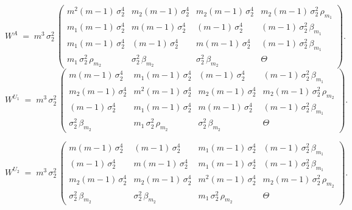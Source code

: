 \documentclass[12pt,a4paper]{article}
\begin{document}
\[
W^{A} \;=\; m^{3}\,\sigma_{2}^{2}\,
\begin{pmatrix}
m^{2}(m-1)\,\sigma_{2}^{4} & m_{2}(m-1)\,\sigma_{2}^{4} & m_{2}(m-1)\,\sigma_{2}^{4} & m_{2}(m-1)\,\sigma_{2}^{2}\,\rho_{m_{1}} \\[2pt]
m_{1}(m-1)\,\sigma_{2}^{4} & m(m-1)\,\sigma_{2}^{4}    & (m-1)\,\sigma_{2}^{4}      & (m-1)\,\sigma_{2}^{2}\,\beta_{m_{1}}     \\[2pt]
m_{1}(m-1)\,\sigma_{2}^{4} & (m-1)\,\sigma_{2}^{4}     & m(m-1)\,\sigma_{2}^{4}    & (m-1)\,\sigma_{2}^{2}\,\beta_{m_{1}}     \\[2pt]
m_{1}\,\sigma_{2}^{2}\,\rho_{m_{2}} & \sigma_{2}^{2}\,\beta_{m_{2}}         & \sigma_{2}^{2}\,\beta_{m_{2}}         & \Theta
\end{pmatrix}.
\]
\[
W^{U_{1}} \;=\; m^{3}\,\sigma_{2}^{2}\,
\begin{pmatrix}
m(m-1)\,\sigma_{2}^{4}      & m_{1}(m-1)\,\sigma_{2}^{4} & (m-1)\,\sigma_{2}^{4}      & (m-1)\,\sigma_{2}^{2}\,\beta_{m_{1}}     \\[2pt]
m_{2}(m-1)\,\sigma_{2}^{4} & m^{2}(m-1)\,\sigma_{2}^{4} & m_{2}(m-1)\,\sigma_{2}^{4} & m_{2}(m-1)\,\sigma_{2}^{2}\,\rho_{m_{2}} \\[2pt]
(m-1)\,\sigma_{2}^{4}      & m_{1}(m-1)\,\sigma_{2}^{4} & m(m-1)\,\sigma_{2}^{4}     & (m-1)\,\sigma_{2}^{2}\,\beta_{m_{1}}     \\[2pt]
\sigma_{2}^{2}\,\beta_{m_{2}}         & m_{1}\,\sigma_{2}^{2}\,\rho_{m_{2}} & \sigma_{2}^{2}\,\beta_{m_{2}}         & \Theta
\end{pmatrix}.
\]

\[
W^{U_{2}} \;=\; m^{3}\,\sigma_{2}^{2}\,
\begin{pmatrix}
m(m-1)\,\sigma_{2}^{4}      & (m-1)\,\sigma_{2}^{4}      & m_{1}(m-1)\,\sigma_{2}^{4} & (m-1)\,\sigma_{2}^{2}\,\beta_{m_{1}}     \\[2pt]
(m-1)\,\sigma_{2}^{4}      & m(m-1)\,\sigma_{2}^{4}     & m_{1}(m-1)\,\sigma_{2}^{4} & (m-1)\,\sigma_{2}^{2}\,\beta_{m_{1}}     \\[2pt]
m_{2}(m-1)\,\sigma_{2}^{4} & m_{2}(m-1)\,\sigma_{2}^{4} & m^{2}(m-1)\,\sigma_{2}^{4} & m_{2}(m-1)\,\sigma_{2}^{2}\,\rho_{m_{2}} \\[2pt]
\sigma_{2}^{2}\,\beta_{m_{2}}         & \sigma_{2}^{2}\,\beta_{m_{2}}         & m_{1}\,\sigma_{2}^{2}\,\rho_{m_{2}} & \Theta
\end{pmatrix}.
\]
\end{document}
